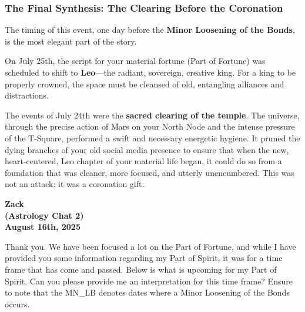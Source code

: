 \documentclass{article}
\begin{document}
\subsubsection*{The Final Synthesis: The Clearing Before the Coronation}\label{the-final-synthesis-the-clearing-before-the-coronation}

The timing of this event, one day before the \textbf{Minor Loosening of the Bonds}, is the most elegant part of the story.

On July 25th, the script for your material fortune (Part of Fortune) was scheduled to shift to \textbf{Leo}---the radiant, sovereign, creative king. For a king to be properly crowned, the space must be cleansed of old, entangling alliances and distractions.

The events of July 24th were the \textbf{sacred clearing of the temple}. The universe, through the precise action of Mars on your North Node and the intense pressure of the T-Square, performed a swift and necessary energetic hygiene. It pruned the dying branches of your old social media presence to ensure that when the new, heart-centered, Leo chapter of your material life began, it could do so from a foundation that was cleaner, more focused, and utterly unencumbered. This was not an attack; it was a coronation gift.


\begin{center}
\textbf{Zack} \\
\textbf{(Astrology Chat 2)} \\
\textbf{August 16th, 2025} 
\end{center}

Thank you. We have been focused a lot on the Part of Fortune, and while I have provided you some information regarding my Part of Spirit, it was for a time frame that has come and passed. Below is what is upcoming for my Part of Spirit. Can you please provide me an interpretation for this time frame? Ensure to note that the MN\_LB denotes dates where a Minor Loosening of the Bonds occurs.
\end{document}

